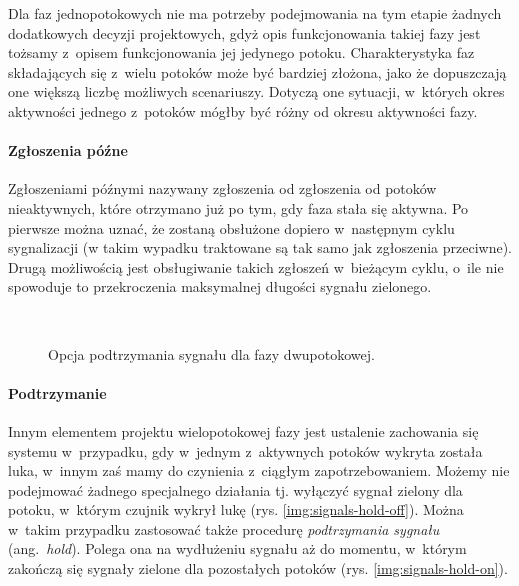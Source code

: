 \documentclass{pracamgr}
\newcommand{\ang}[1]{(ang.~\emph{#1})}
\theoremstyle{plain}
\begin{document}
Dla faz jednopotokowych nie ma potrzeby podejmowania na tym etapie
żadnych dodatkowych decyzji projektowych, gdyż opis funkcjonowania
takiej fazy jest tożsamy z~opisem funkcjonowania jej jedynego
potoku. Charakterystyka faz składających się z~wielu potoków może być
bardziej złożona, jako że dopuszczają one większą liczbę możliwych
scenariuszy. Dotyczą one sytuacji, w~których okres aktywności jednego
z~potoków mógłby być różny od okresu aktywności fazy.

\paragraph{Zgłoszenia późne} Zgłoszeniami późnymi nazywany zgłoszenia
od zgłoszenia od potoków nieaktywnych, które otrzymano już po tym, gdy
faza stała się aktywna. Po pierwsze można uznać, że zostaną obsłużone
dopiero w~następnym cyklu sygnalizacji (w takim wypadku traktowane są
tak samo jak zgłoszenia przeciwne). Drugą możliwością jest
obsługiwanie takich zgłoszeń w~bieżącym cyklu, o~ile nie spowoduje to
przekroczenia maksymalnej długości sygnału zielonego.
\begin{figure}
  \centering
  \\\vspace{0.5cm}
  \caption{Opcja podtrzymania sygnału dla fazy dwupotokowej.}
\end{figure}
\paragraph{Podtrzymanie} Innym elementem projektu wielopotokowej fazy
jest ustalenie zachowania się systemu w~przypadku, gdy w~jednym
z~aktywnych potoków wykryta została luka, w~innym zaś mamy do czynienia
z~ciągłym zapotrzebowaniem. Możemy nie podejmować żadnego specjalnego
działania tj. wyłączyć sygnał zielony dla potoku, w~którym czujnik
wykrył lukę (rys. \ref{img:signals-hold-off}).  Można w~takim przypadku
zastosować także procedurę \emph{podtrzymania sygnału} \ang{hold}. Polega
ona na wydłużeniu sygnału aż do momentu, w~którym zakończą się sygnały
zielone dla pozostałych potoków (rys. \ref{img:signals-hold-on}).
\end{document}
